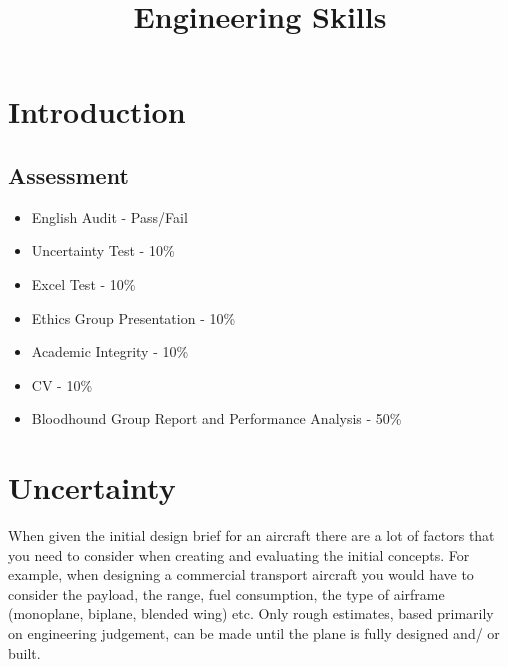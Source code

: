 \documentclass[12pt,a4paper]{article}
\begin{document}
\title{Engineering Skills}
\date{}
\maketitle

\newpage

\tableofcontents

\newpage

\section{Introduction}
	
	\subsection{Assessment}
		\begin{itemize}
			\item English Audit - Pass/Fail
			\item Uncertainty Test - 10\%
			\item Excel Test - 10\%
			\item Ethics Group Presentation - 10\%
			\item Academic Integrity - 10\%	
			\item CV - 10\%
			\item Bloodhound Group Report and Performance Analysis - 50\%
		\end{itemize}
		
\newpage

\section{Uncertainty}
	When given the initial design brief for an aircraft there are a lot of factors that you need to consider when creating and evaluating the initial concepts. For example, when designing a commercial transport aircraft you would have to consider the payload, the range, fuel consumption, the type of airframe (monoplane, biplane, blended wing) etc. Only rough estimates, based primarily on engineering judgement, can be made until the plane is fully designed and/ or built.
	
\end{document}
